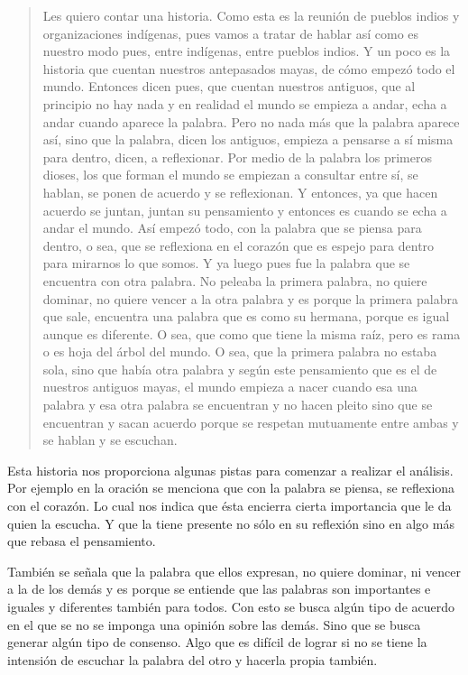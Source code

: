 \documentclass[oneside]{book}
\begin{document}
\begin{quote}
Les quiero contar una historia. Como esta es la reunión de pueblos indios y organizaciones indígenas, pues vamos a tratar de hablar así como es nuestro modo pues, entre indígenas, entre pueblos indios. Y un poco es la historia que cuentan nuestros antepasados mayas, de cómo empezó todo el mundo. Entonces dicen pues, que cuentan nuestros antiguos, que al principio no hay nada y en realidad el mundo se empieza a andar, echa a andar cuando aparece la palabra. Pero no nada más que la palabra aparece así, sino que la palabra, dicen los antiguos, empieza a pensarse a sí misma para dentro, dicen, a reflexionar. Por medio de la palabra los primeros dioses, los que forman el mundo se empiezan a consultar entre sí, se hablan, se ponen de acuerdo y se reflexionan. Y entonces, ya que hacen acuerdo se juntan, juntan su pensamiento y entonces es cuando se echa a andar el mundo. Así empezó todo, con la palabra que se piensa para dentro, o sea, que se reflexiona en el corazón que es espejo para dentro para mirarnos lo que somos. Y ya luego pues fue la palabra que se encuentra con otra palabra. No peleaba la primera palabra, no quiere dominar, no quiere vencer a la otra palabra y es porque la primera palabra que sale, encuentra una palabra que es como su hermana, porque es igual aunque es diferente. O sea, que como que tiene la misma raíz, pero es rama o es hoja del árbol del mundo. O sea, que la primera palabra no estaba sola, sino que había otra palabra y según este pensamiento que es el de nuestros antiguos mayas, el mundo empieza a nacer cuando esa una palabra y esa otra palabra se encuentran y no hacen pleito sino que se encuentran y sacan acuerdo porque se respetan mutuamente entre ambas y se hablan y se escuchan.
\end{quote}

Esta historia nos proporciona algunas pistas para comenzar a realizar el análisis. Por ejemplo en la oración se menciona que con la palabra se piensa, se reflexiona con el corazón. Lo cual nos indica que ésta encierra cierta importancia que le da quien la escucha. Y que la tiene presente no sólo en su reflexión sino en algo más que rebasa el pensamiento.

También se señala que la palabra que ellos expresan, no quiere dominar, ni vencer a la de los demás y es porque se entiende que las palabras son importantes e iguales y diferentes también para todos. Con esto se busca algún tipo de acuerdo en el que se no se imponga una opinión sobre las demás. Sino que se busca generar algún tipo de consenso. Algo que es difícil de lograr si no se tiene la intensión de escuchar la palabra del otro y hacerla propia también.
\end{document}
